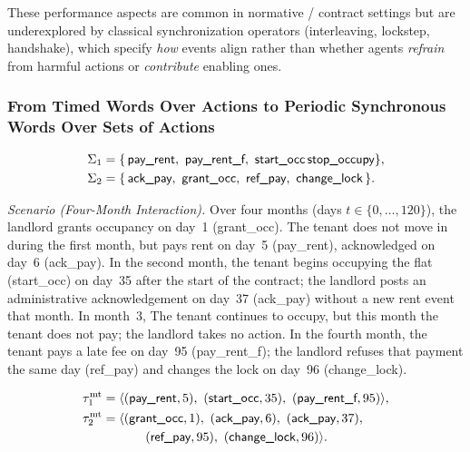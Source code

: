 \documentclass{article}
\begin{document}
  \noindent These performance aspects are common in normative / contract settings but are underexplored by classical synchronization operators (interleaving, lockstep, handshake), which specify \emph{how} events align rather than whether agents \emph{refrain} from harmful actions or \emph{contribute} enabling ones.
  
  \subsubsection{From Timed Words Over Actions to Periodic Synchronous Words Over Sets of Actions}
  
  \begin{example}
  \label{ex:timed-words-only}
  \[
  \begin{aligned}
  \Sig{1}&=\{\,\textsf{pay\_rent},\ \textsf{pay\_rent\_f},\ \textsf{start\_occ}\, \textsf{stop\_occupy}\},\\
  \Sig{2}&=\{\,\textsf{ack\_pay},\ \textsf{grant\_occ},\ \textsf{ref\_pay},\ \textsf{change\_lock}\,\}.
  \end{aligned}
  \]
  
  \noindent\textit{Scenario (Four-Month Interaction).}
  Over four months (days $t\in\{0,\dots,120\}$), the landlord grants occupancy on day~1
  (\textsf{grant\_occ}). The tenant does not move in during the first month, but pays rent
  on day~5 (\textsf{pay\_rent}), acknowledged on day~6 (\textsf{ack\_pay}). In the second month, the tenant
  begins occupying the flat (\textsf{start\_occ}) on day~35 after the start of the contract; the landlord posts an administrative
  acknowledgement on day~37 (\textsf{ack\_pay}) without a new rent event that month. In month~3,
  The tenant continues to occupy, but this month the tenant does not pay; the landlord takes no action. In the fourth month, the
  tenant pays a late fee on day~95 (\textsf{pay\_rent\_f}); the landlord refuses that payment the
  same day (\textsf{ref\_pay}) and changes the lock on day~96 (\textsf{change\_lock}).
  
  \medskip
  \noindent{}
  
  \[
  \begin{aligned}
  \taumt_{1}&=\trace{(\textsf{pay\_rent},5),\ (\textsf{start\_occ},35),\ (\textsf{pay\_rent\_f},95)},\\
  \taumt_{2}&=\trace{(\textsf{grant\_occ},1),\ (\textsf{ack\_pay},6),\ (\textsf{ack\_pay},37),\\
             &\hspace{3.4em}(\textsf{ref\_pay},95),\ (\textsf{change\_lock},96)}.
  \end{aligned}
  \]
  \end{example}
  
\end{document}
